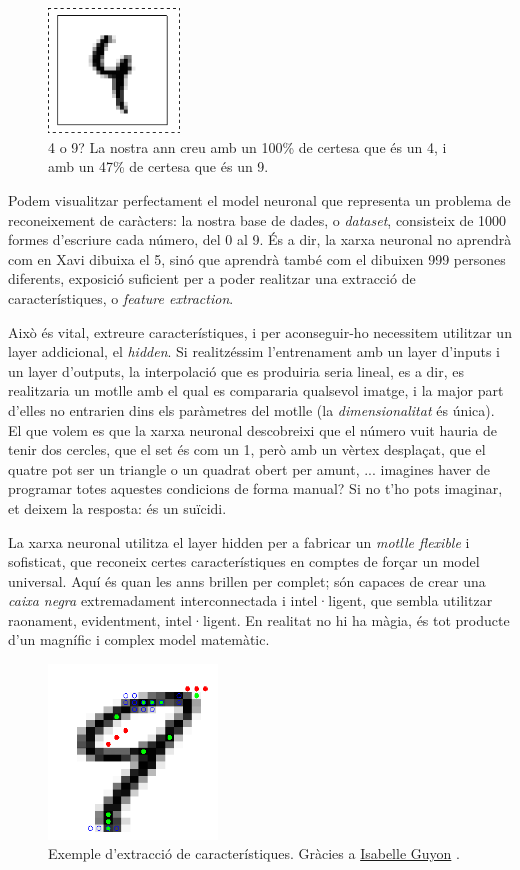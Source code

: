 \begin{figure}[ht!]
\centering
\includegraphics[width=35mm]{data/confusing_2.png}
\caption{4 o 9? La nostra \ac{ann} creu amb un 100\% de certesa que és un 4, i amb un 47\% de certesa que és un 9.}
\label{certesa}
\end{figure}

Podem visualitzar perfectament el model neuronal que representa un problema de reconeixement de caràcters: la nostra
base de dades, o \emph{dataset}, consisteix de 1000 formes d'escriure cada número, del 0 al 9. És a dir, la xarxa neuronal
no aprendrà com en Xavi dibuixa el 5, sinó que aprendrà també com el dibuixen 999 persones diferents, exposició suficient per
a poder realitzar una extracció de característiques, o \emph{feature extraction}.

Això és vital, extreure característiques, i per aconseguir-ho necessitem utilitzar un layer addicional, el \emph{hidden}. 
Si realitzéssim l'entrenament amb un layer d'inputs i un layer d'outputs, la interpolació que es produiria seria lineal,
es a dir, es realitzaria un motlle amb el qual es compararia qualsevol imatge, i la major part d'elles no entrarien dins
els paràmetres del motlle (la \emph{dimensionalitat} és única). El que volem es que la xarxa neuronal descobreixi que el número
vuit hauria de tenir dos cercles, que el set és com un 1, però amb un vèrtex desplaçat, que el quatre pot ser un triangle o un
quadrat obert per amunt, ... imagines haver de programar totes aquestes condicions de forma manual? Si no t'ho pots imaginar, 
et deixem la resposta: és un suïcidi.

La xarxa neuronal utilitza el layer hidden per a fabricar un \emph{motlle flexible} i sofisticat, que reconeix certes característiques
en comptes de forçar un model universal. Aquí és quan les \ac{ann}s brillen per complet; són capaces de crear una \emph{caixa negra}
extremadament interconnectada i intel·ligent, que sembla utilitzar raonament, evidentment, intel·ligent. En realitat no hi ha màgia, 
és tot producte d'un magnífic i complex model matemàtic.

\begin{figure}[ht!]
\centering
\includegraphics[width=45mm]{data/extraction-0.png}
\caption{Exemple d'extracció de característiques. Gràcies a \href{http://clopinet.com/isabelle/Projects/ETH/}{Isabelle Guyon} \autocite{guyonfe}.}
\label{extracció}
\end{figure}

